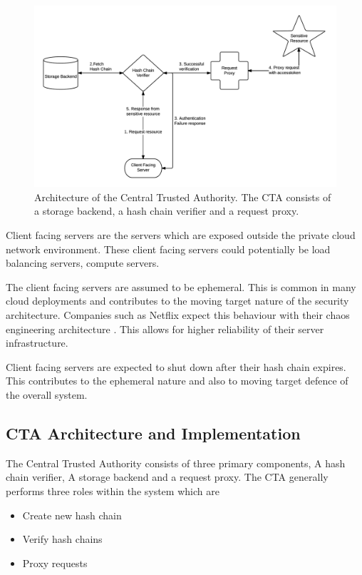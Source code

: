 \documentclass{sig-alternate-05-2015}
\begin{document}
\begin{figure}[!ht]
  \centering
  \includegraphics[keepaspectratio=true,scale=0.8]{cta_architecture}
  \caption{Architecture of the Central Trusted Authority. The CTA consists of a storage backend, a hash chain verifier and a request proxy.}
  \label{fig:ctaarchitecture}
\end{figure}


Client facing servers are the servers which are exposed outside the private cloud network environment. These client facing servers could potentially be load balancing servers, compute servers.

The client facing servers are assumed to be ephemeral. This is common in many cloud deployments \cite{vaquero_dynamically_2011} and contributes to the moving target nature of the security architecture. Companies such as Netflix expect this behaviour with their chaos engineering architecture \cite{basiri_chaos_2016}. This allows for higher reliability of their server infrastructure.

Client facing servers are expected to shut down after their hash chain expires. This contributes to the ephemeral nature and also to moving target defence of the overall system.

\subsection*{CTA Architecture and Implementation}

The Central Trusted Authority consists of three primary components, A hash chain verifier, A storage backend and a request proxy. The CTA generally performs three roles within the system which are

\begin{itemize}
\item Create new hash chain
\item Verify hash chains
\item Proxy requests
\end{itemize}
\end{document}
